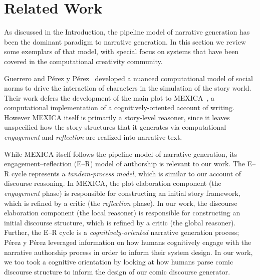 \section{Related Work}

As discussed in the Introduction, the pipeline model of narrative generation 
has been the dominant paradigm to narrative generation. In this section we
review some exemplars of that model, with special focus on systems that have
been covered in the computational creativity community.

Guerrero and P\'erez y P\'erez~\cite{guerrero2014social} developed a
nuanced computational model of social norms to drive the interaction of
characters in the simulation of the story world. Their work defers the
development of the main plot to MEXICA~\cite{perez2001mexica}, a
computational implementation of a cognitively-oriented account of writing.
However MEXICA itself is primarily a story-level reasoner, since it leaves
unspecified how the story structures that it generates via computational
\emph{engagement} and \emph{reflection} are realized into narrative text. 

While MEXICA itself follows the pipeline model of narrative generation, its
engagement--reflection (E--R) model of authorship is relevant to our work. 
The E--R cycle represents a \emph{tandem-process model}, which is similar to our 
account of discourse reasoning. In MEXICA, the plot
elaboration component (the \emph{engagement} phase) is responsible for 
constructing an initial story framework, which is refined by a critic (the
\emph{reflection} phase). In our work, the discourse elaboration component
(the local reasoner) is responsible for constructing an initial discourse
structure, which is refined by a critic (the global reasoner).  Further, 
the E--R cycle is a \emph{cognitively-oriented} narrative generation process;
P\'erez y P\'erez leveraged information on how humans cognitively 
engage with the narrative authorship process in order to inform their system 
design. In our work, we too took a cognitive orientation by looking at how 
humans parse comic discourse structure to inform the design of our comic 
discourse generator.

